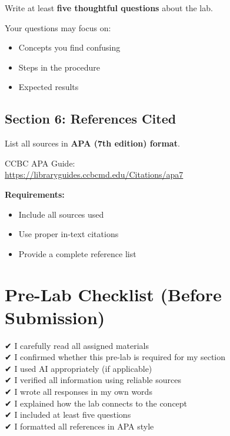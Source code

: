 \documentclass[
  letterpaper,
  DIV=11,
  numbers=noendperiod]{scrreprt}
\begin{document}
Write at least \textbf{five thoughtful questions} about the lab.

Your questions may focus on:

\begin{itemize}
\item
  Concepts you find confusing
\item
  Steps in the procedure
\item
  Expected results
\end{itemize}

\subsection*{\texorpdfstring{\textbf{Section 6: References
Cited}}{Section 6: References Cited}}\label{section-6-references-cited}

List all sources in \textbf{APA (7th edition) format}.

CCBC APA Guide:\\
\url{https://libraryguides.ccbcmd.edu/Citations/apa7}

\textbf{Requirements:}

\begin{itemize}
\item
  Include all sources used
\item
  Use proper in-text citations
\item
  Provide a complete reference list
\end{itemize}

\section*{\texorpdfstring{\textbf{Pre-Lab Checklist (Before
Submission)}}{Pre-Lab Checklist (Before Submission)}}\label{pre-lab-checklist-before-submission}


✔ I carefully read all assigned materials\\
✔ I confirmed whether this pre-lab is required for my section\\
✔ I used AI appropriately (if applicable)\\
✔ I verified all information using reliable sources\\
✔ I wrote all responses in my own words\\
✔ I explained how the lab connects to the concept\\
✔ I included at least five questions\\
✔ I formatted all references in APA style
\end{document}
